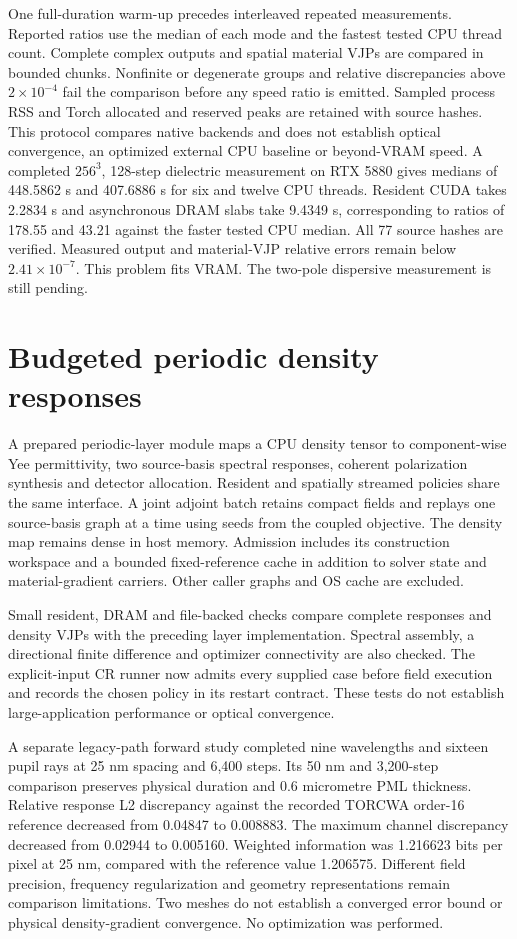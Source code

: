\documentclass[11pt,a4paper]{article}
\begin{document}
One full-duration warm-up precedes interleaved repeated measurements.
Reported ratios use the median of each mode and the fastest tested CPU thread
count. Complete complex outputs and spatial material VJPs are compared in
bounded chunks. Nonfinite or degenerate groups and relative discrepancies
above $2\times10^{-4}$ fail the comparison before any speed ratio is emitted.
Sampled process RSS and Torch allocated and reserved peaks are retained with
source hashes. This protocol compares native backends and does not establish
optical convergence, an optimized external CPU baseline or beyond-VRAM speed.
A completed $256^3$, 128-step dielectric measurement on RTX 5880 gives
medians of 448.5862 s and 407.6886 s for six and twelve CPU threads.
Resident CUDA takes 2.2834 s and asynchronous DRAM slabs take 9.4349 s,
corresponding to ratios of 178.55 and 43.21 against the faster tested CPU
median. All 77 source hashes are verified. Measured output and material-VJP
relative errors remain below $2.41\times10^{-7}$. This problem fits VRAM.
The two-pole dispersive measurement is still pending.


\section{Budgeted periodic density responses}
A prepared periodic-layer module maps a CPU density tensor to component-wise
Yee permittivity, two source-basis spectral responses, coherent polarization
synthesis and detector allocation. Resident and spatially streamed policies
share the same interface. A joint adjoint batch retains compact fields and
replays one source-basis graph at a time using seeds from the coupled objective.
The density map remains dense in host memory. Admission includes its construction
workspace and a bounded fixed-reference cache in addition to solver state and
material-gradient carriers. Other caller graphs and OS cache are excluded.

Small resident, DRAM and file-backed checks compare complete responses and
density VJPs with the preceding layer implementation. Spectral assembly,
a directional finite difference and optimizer connectivity are also checked.
The explicit-input CR runner now admits every supplied case before field
execution and records the chosen policy in its restart contract. These tests
do not establish large-application performance or optical convergence.

A separate legacy-path forward study completed nine wavelengths and sixteen
pupil rays at 25 nm spacing and 6,400 steps. Its 50 nm and 3,200-step comparison
preserves physical duration and 0.6 micrometre PML thickness. Relative response
L2 discrepancy against the recorded TORCWA order-16 reference decreased from
0.04847 to 0.008883. The maximum channel discrepancy decreased from 0.02944
to 0.005160. Weighted information was 1.216623 bits per pixel at 25 nm,
compared with the reference value 1.206575. Different field precision,
frequency regularization and geometry representations remain
comparison limitations. Two meshes do not establish a converged error bound
or physical density-gradient convergence. No optimization was performed.
\end{document}
